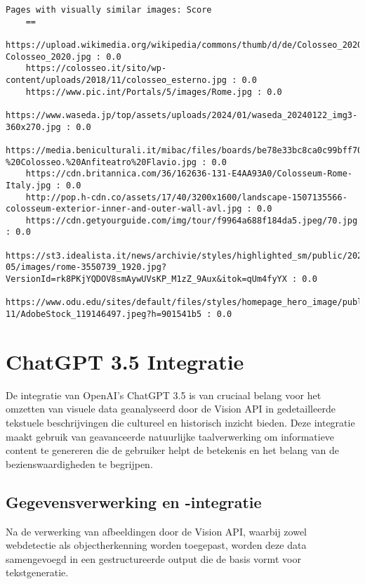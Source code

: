 \begin{lstlisting}[caption={Output vision api},label={lst:outputvisionapi}]
    Pages with visually similar images: Score
    ==
    https://upload.wikimedia.org/wikipedia/commons/thumb/d/de/Colosseo_2020.jpg/1200px-Colosseo_2020.jpg : 0.0
    https://colosseo.it/sito/wp-content/uploads/2018/11/colosseo_esterno.jpg : 0.0
    https://www.pic.int/Portals/5/images/Rome.jpg : 0.0
    https://www.waseda.jp/top/assets/uploads/2024/01/waseda_20240122_img3-360x270.jpg : 0.0
    https://media.beniculturali.it/mibac/files/boards/be78e33bc8ca0c99bff70aa174035096/Luoghi/Parco%20archeologico%20del%20Colosseo%20-%20Colosseo.%20Anfiteatro%20Flavio.jpg : 0.0
    https://cdn.britannica.com/36/162636-131-E4AA93A0/Colosseum-Rome-Italy.jpg : 0.0
    http://pop.h-cdn.co/assets/17/40/3200x1600/landscape-1507135566-colosseum-exterior-inner-and-outer-wall-avl.jpg : 0.0
    https://cdn.getyourguide.com/img/tour/f9964a688f184da5.jpeg/70.jpg : 0.0
    https://st3.idealista.it/news/archivie/styles/highlighted_sm/public/2024-05/images/rome-3550739_1920.jpg?VersionId=rk8PKjYQDOV8smAywUVsKP_M1zZ_9Aux&itok=qUm4fyYX : 0.0
    https://www.odu.edu/sites/default/files/styles/homepage_hero_image/public/images/2022-11/AdobeStock_119146497.jpeg?h=901541b5 : 0.0
\end{lstlisting}

\section{ChatGPT 3.5 Integratie}
De integratie van OpenAI's ChatGPT 3.5 is van cruciaal belang voor het omzetten van visuele data geanalyseerd door de Vision API in gedetailleerde tekstuele beschrijvingen die cultureel en historisch inzicht bieden. Deze integratie maakt gebruik van geavanceerde natuurlijke taalverwerking om informatieve content te genereren die de gebruiker helpt de betekenis en het belang van de bezienswaardigheden te begrijpen.

\subsection{Gegevensverwerking en -integratie}
Na de verwerking van afbeeldingen door de Vision API, waarbij zowel webdetectie als objectherkenning worden toegepast, worden deze data samengevoegd in een gestructureerde output die de basis vormt voor tekstgeneratie. 

